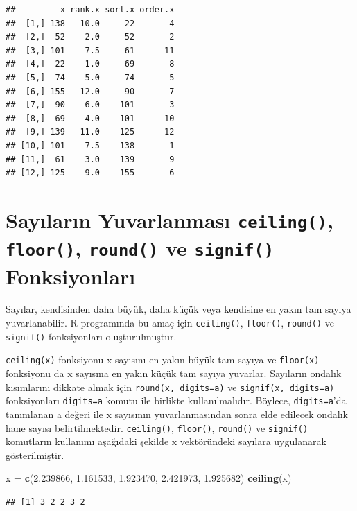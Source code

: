 \documentclass[
]{book}
\newenvironment{Shaded}{\begin{snugshade}}{\end{snugshade}}
\newcommand{\FloatTok}[1]{\textcolor[rgb]{0.00,0.00,0.81}{#1}}
\newcommand{\FunctionTok}[1]{\textcolor[rgb]{0.13,0.29,0.53}{\textbf{#1}}}
\newcommand{\NormalTok}[1]{#1}
\newcommand{\OtherTok}[1]{\textcolor[rgb]{0.56,0.35,0.01}{#1}}
\begin{document}
\begin{verbatim}
##         x rank.x sort.x order.x
##  [1,] 138   10.0     22       4
##  [2,]  52    2.0     52       2
##  [3,] 101    7.5     61      11
##  [4,]  22    1.0     69       8
##  [5,]  74    5.0     74       5
##  [6,] 155   12.0     90       7
##  [7,]  90    6.0    101       3
##  [8,]  69    4.0    101      10
##  [9,] 139   11.0    125      12
## [10,] 101    7.5    138       1
## [11,]  61    3.0    139       9
## [12,] 125    9.0    155       6
\end{verbatim}

\section{\texorpdfstring{Sayıların Yuvarlanması \texttt{ceiling()}, \texttt{floor()}, \texttt{round()} ve \texttt{signif()} Fonksiyonları}{Sayıların Yuvarlanması ceiling(), floor(), round() ve signif() Fonksiyonları}}\label{sayux131larux131n-yuvarlanmasux131-ceiling-floor-round-ve-signif-fonksiyonlarux131}

Sayılar, kendisinden daha büyük, daha küçük veya kendisine en yakın tam sayıya yuvarlanabilir. R programında bu amaç için \texttt{ceiling()}, \texttt{floor()}, \texttt{round()} ve \texttt{signif()} fonksiyonları oluşturulmuştur.

\texttt{ceiling(x)} fonksiyonu x sayısını en yakın büyük tam sayıya ve \texttt{floor(x)} fonksiyonu da x sayısına en yakın küçük tam sayıya yuvarlar. Sayıların ondalık kısımlarını dikkate almak için \texttt{round(x,\ digits=a)} ve \texttt{signif(x,\ digits=a)} fonksiyonları \texttt{digits=a} komutu ile birlikte kullanılmalıdır. Böylece, \texttt{digits=a}'da tanımlanan a değeri ile x sayısının yuvarlanmasından sonra elde edilecek ondalık hane sayısı belirtilmektedir. \texttt{ceiling()}, \texttt{floor()}, \texttt{round()} ve \texttt{signif()} komutların kullanımı aşağıdaki şekilde x vektöründeki sayılara uygulanarak gösterilmiştir.

\begin{Shaded}
\begin{Highlighting}[]
\NormalTok{x }\OtherTok{=} \FunctionTok{c}\NormalTok{(}\FloatTok{2.239866}\NormalTok{, }\FloatTok{1.161533}\NormalTok{, }\FloatTok{1.923470}\NormalTok{, }\FloatTok{2.421973}\NormalTok{, }\FloatTok{1.925682}\NormalTok{)}
\FunctionTok{ceiling}\NormalTok{(x)}
\end{Highlighting}
\end{Shaded}

\begin{verbatim}
## [1] 3 2 2 3 2
\end{verbatim}
\end{document}
